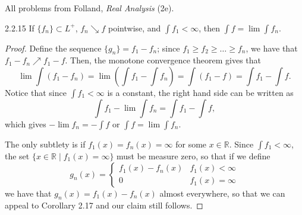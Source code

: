 \documentclass[11pt]{article}
\begin{document}
All problems from Folland, \textit{Real Analysis} (2e).
\begin{problem}{2.2.15}
	If \( \{f_n\} \subset L^+ \), \( f_n \searrow f \) pointwise, and \( \int f_1 < \infty \), then \( \int f = \lim \int f_n \).
\end{problem}
\begin{proof}
	Define the sequence \( \{g_n\} = f_1 - f_n \); since \( f_1 \geq f_2 \geq \dots \geq f_n \), we have that \( f_1 - f_n \nearrow f_1 - f \).
	Then, the monotone convergence theorem gives that
	\begin{equation}
		\label{eq:1}
		\lim \int (f_1 - f_n) = \lim (\int f_1 - \int f_n ) = \int (f_1 - f) = \int f_1 - \int f.
	\end{equation}
	Notice that since \( \int f_1 < \infty \) is a constant, the right hand side can be written as
	\begin{equation}
		\label{eq:2}
		\int f_1 - \lim \int f_n = \int f_1 - \int f,
	\end{equation}
	which gives \( -\lim f_n = - \int f \) or \( \int f = \lim \int f_n \).

	The only subtlety is if \( f_1(x) = f_n(x) = \infty \) for some \( x \in \mathbb{R} \).
	Since \( \int f_1 < \infty \), the set \( \{ x \in \mathbb{R} \mid f_1(x) = \infty \} \) must be measure zero, so that if we define
	\begin{equation}
		\label{eq:3}
		g_n(x) = \begin{cases}
			f_1(x) - f_n(x) & f_1(x) < \infty \\
			0               & f_1(x) = \infty
		\end{cases}
	\end{equation}
	we have that \( g_n(x) = f_1(x) - f_n(x) \) almost everywhere, so that we can appeal to Corollary 2.17 and our claim still follows.
\end{proof}
\end{document}
